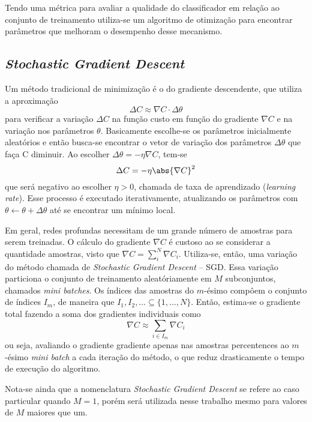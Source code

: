 Tendo uma métrica para avaliar a qualidade do classificador em relação ao conjunto de treinamento utiliza-se um algoritmo de otimização para encontrar parâmetros que melhoram o desempenho desse mecanismo.

\subsection{\textit{Stochastic Gradient Descent}}
\label{sec:sgd}
Um método tradicional de minimização é o do gradiente descendente, que utiliza a aproximação
\begin{equation}
\Delta C \approx \nabla C \cdot \Delta \theta
\end{equation}
para verificar a variação $\Delta C$ na função custo em função do gradiente $\nabla C$ e na variação nos parâmetros $\theta$. Basicamente escolhe-se os parâmetros inicialmente aleatórios e então busca-se encontrar o vetor de variação dos parâmetros $\Delta \theta$ que faça C diminuir. Ao escolher $\Delta \theta = -\eta \nabla C$, tem-se
\begin{equation}
\Delta C = -\eta \abs{\nabla C}^2
\end{equation}
que será negativo ao escolher $\eta > 0$, chamada de taxa de aprendizado (\textit{learning rate}). Esse processo é executado iterativamente, atualizando os parâmetros com $\theta \gets \theta + \Delta \theta$ até se encontrar um mínimo local.

Em geral, redes profundas necessitam de um grande número de amostras para serem treinadas. O cálculo do gradiente $\nabla C$ é custoso ao se considerar a quantidade amostras, visto que $\nabla C = \sum_i^N \nabla C_i$. Utiliza-se, então, uma variação do método chamada de \textit{Stochastic Gradient Descent} -- SGD. Essa variação particiona o conjunto de treinamento aleatóriamente em $M$ subconjuntos, chamados \textit{mini batches}. Os índices das amostras do $m$-ésimo  compôem o conjunto de índices $I_m$, de maneira que $I_1, I_2,\dots \subseteq \{1,\dots,N\}$. Então, estima-se o gradiente total fazendo a soma dos gradientes individuais como
\begin{equation}
\nabla C \approx \sum_{i \in I_m} \nabla C_i
\end{equation}
ou seja, avaliando o gradiente gradiente apenas nas amostras percentences ao $m$-ésimo \textit{mini batch} a cada iteração do método, o que reduz drasticamente o tempo de execução do algoritmo.

Nota-se ainda que a nomenclatura \textit{Stochastic Gradient Descent} se refere ao caso particular quando $M=1$, porém será utilizada nesse trabalho mesmo para valores de $M$ maiores que um.

